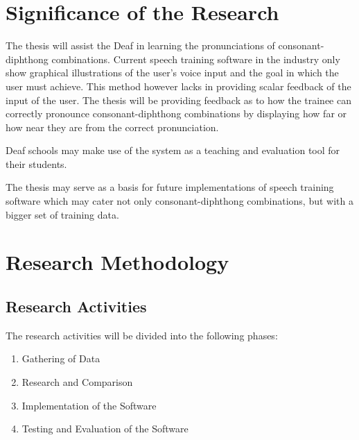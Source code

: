 
\section{Significance of the Research}
\label{sec:significance}

The thesis will assist the Deaf in learning the pronunciations of consonant-diphthong combinations. Current speech training software in the industry only show graphical illustrations of the user's voice input and the goal in which the user must achieve. This method however lacks in providing scalar feedback of the input of the user. The thesis will be providing feedback as to how the trainee can correctly pronounce consonant-diphthong combinations by displaying how far or how near they are from the correct pronunciation.

Deaf schools may make use of the system as a teaching and evaluation tool for their students.

The thesis may serve as a basis for future implementations of speech training software which may cater not only consonant-diphthong combinations, but with a bigger set of training data.

\section{Research Methodology}
\label{sec:methodology}

\subsection{Research Activities}
The research activities will be divided into the following phases:
\begin{enumerate}
\item Gathering of Data
\item Research and Comparison
\item Implementation of the Software
\item Testing and Evaluation of the Software
\end{enumerate}

